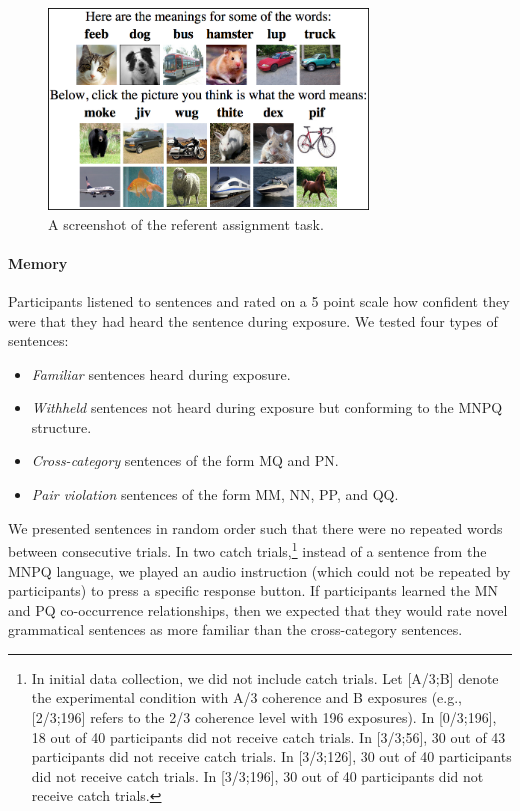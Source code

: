 \documentclass[man,floatsintext]{apa6}
\begin{document}
\begin{figure}[t]
  \begin{center}
    \includegraphics[width=8.5cm]{meaning-html-cropped.png}
    \caption{A screenshot of the referent assignment task.}
    \label{meaning-task}
  \end{center}
\end{figure}

\paragraph{Memory}
Participants listened to sentences and rated on a 5 point scale how confident they were that they had heard the sentence during exposure. We tested four types of sentences:

\begin{itemize}
\item \emph{Familiar} sentences heard during exposure.
\item \emph{Withheld} sentences not heard during exposure but conforming to the MNPQ structure.
\item \emph{Cross-category} sentences of the form MQ and PN.
\item \emph{Pair violation} sentences of the form MM, NN, PP, and QQ.
\end{itemize}

We presented sentences in random order such that there were no repeated words between consecutive trials. In two catch trials,\footnote{\label{catch-trials} In initial data collection, we did not include catch trials.  Let [A/3;B] denote the experimental condition with A/3 coherence and B exposures (e.g., [2/3;196] refers to the 2/3 coherence level with 196 exposures). In [0/3;196], 18 out of 40 participants did not receive catch trials. In [3/3;56], 30 out of 43 participants did not receive catch trials. In [3/3;126], 30 out of 40 participants did not receive catch trials. In [3/3;196], 30 out of 40 participants did not receive catch trials.} instead of a sentence from the MNPQ language, we played an audio instruction (which could not be repeated by participants) to press a specific response button.  If participants learned the MN and PQ co-occurrence relationships, then we expected that they would rate novel grammatical sentences as more familiar than the cross-category sentences.
\end{document}
